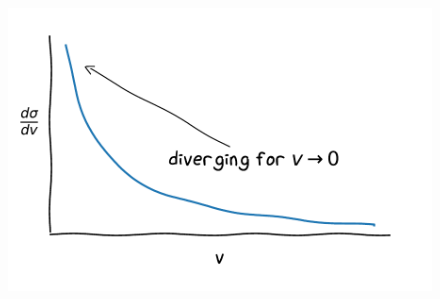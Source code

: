 \documentclass[aspectratio=1610, 9pt]{beamer}
\begin{document}
\begin{frame}[c]
\begin{columns}[onlytextwidth]
    \begin{column}{0.5\textwidth}
      \begin{figure}
        \includegraphics[width=\textwidth]{diverging_v.pdf}
      \end{figure}
    \end{column}
    \end{columns}
\end{frame}
\end{document}
